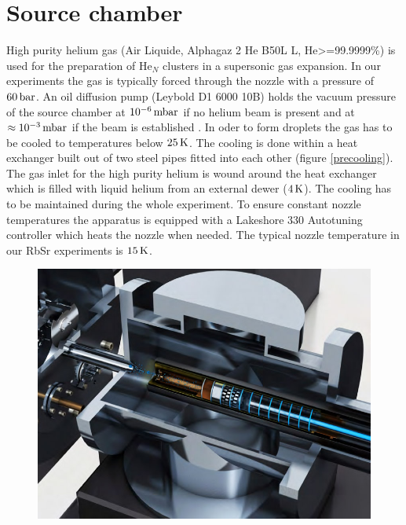 \documentclass[parskip,12pt,headsepline,a4paper] {scrbook}
\begin{document}
\section{Source chamber}
\vspace{-1\baselineskip}
High purity helium gas (Air Liquide, Alphagaz 2 He B50L L, He>=99.9999\%) is used for the preparation of He$_N$ clusters in a supersonic gas expansion. In our experiments the gas is typically forced through the nozzle with a pressure of $\unit[60]{bar}$. An oil diffusion pump (Leybold D1 6000 10B) holds the vacuum pressure of the source chamber at $\unit[10^{-6}]{mbar}$ if no helium beam is present and at $\approx \unit[10^{-3}]{mbar}$ if the beam is established \cite{krois}. In oder to form droplets the gas has to be cooled to temperatures below $\unit[25]{K}$. The cooling is done within a heat exchanger built out of two steel pipes fitted into each other (figure \ref{precooling}). The gas inlet for the high purity helium is wound around the heat exchanger which is filled with liquid helium from an external dewer ($\unit[4]{K}$). The cooling has to be maintained during the whole experiment. To ensure constant nozzle temperatures the apparatus is equipped with a Lakeshore 330 Autotuning controller which heats the nozzle when needed. The typical nozzle temperature in our RbSr experiments is $\unit[15]{K}$.

\begin{figure}[ht]
\centerline{
\includegraphics[width=12cm]{./experimental_setup/pre_cooling.jpg}}
\end{figure}
\end{document}
